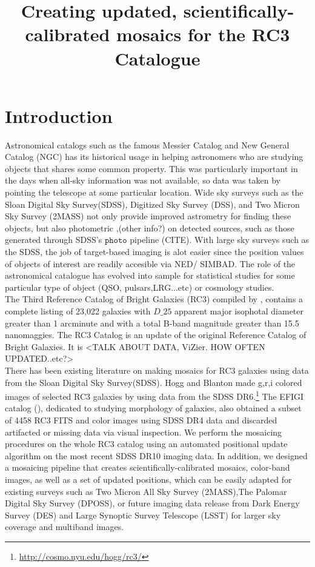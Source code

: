 \documentclass[5p]{elsarticle}
\begin{document}
\title{Creating updated, scientifically-calibrated mosaics for the RC3 Catalogue}
\maketitle 

\section{Introduction}
Astronomical catalogs such as the famous Messier Catalog and New General Catalog (NGC) has its historical usage in helping  astronomers who are studying objects that shares some common property. This was particularly important in the days when all-sky information was not available, so data was taken by pointing the telescope at some particular location.  
Wide sky surveys such as the Sloan Digital Sky Survey(SDSS), Digitized Sky Survey (DSS), and Two Micron Sky Survey (2MASS) not only provide improved astrometry for finding these objects, but also photometric ,(other info?) on detected sources, such as those generated through SDSS's $\texttt{photo}$ pipeline (CITE).
With large sky surveys such as the SDSS, the job of target-based imaging is alot easier since the position values of objects of interest are readily accesible via NED/ SIMBAD. The role of the astronomical catalogue has evolved into sample for statistical studies for some particular type of object (QSO, pulsars,LRG...etc) or cosmology studies.
\\
\indent 
The Third Reference Catalog of Bright Galaxies (RC3) compiled by \citet{rc3}, contains a  complete listing of 23,022 galaxies with $D\_25$ apparent major isophotal diameter  greater than 1 arcminute and with a total B-band magnitude greater than 15.5 nanomaggies.
The RC3 Catalog is an update of the original Reference Catalog of Bright Galaxies. It is 
<TALK ABOUT DATA, ViZier. HOW OFTEN UPDATED..etc?> 
\\
\indent
There has been existing literature on making mosaics for RC3 galaxies using data from the Sloan Digital Sky Survey(SDSS). Hogg and Blanton made g,r,i colored images of selected RC3 galaxies by using data from the SDSS DR6.\footnote{\url{http://cosmo.nyu.edu/hogg/rc3/}} The EFIGI catalog (\citet{efigi}), dedicated to studying morphology of galaxies, also  obtained a subset of 4458 RC3 FITS and color images using SDSS DR4 data and discarded artifacted or missing data via visual inspection. We perform the mosaicing procedures on the whole RC3 catalog using an automated positional update algorithm on the most recent SDSS DR10 imaging data. In addition, we designed a mosaicing pipeline that creates scientifically-calibrated mosaics, color-band images, as well as a set of updated positions, which can be easily adapted for existing surveys such as Two Micron All Sky Survey  (2MASS),The Palomar Digital Sky Survey (DPOSS), or future imaging data release from  Dark Energy Survey (DES) and Large Synoptic Survey Telescope (LSST) for larger sky coverage and multiband images.
\end{document}
